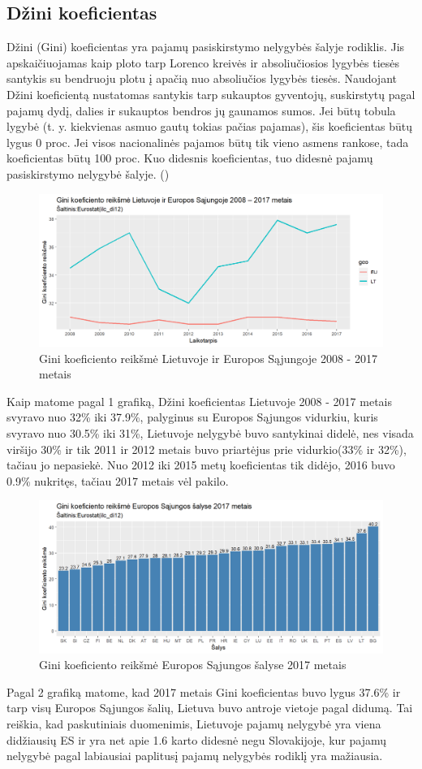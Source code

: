 \documentclass[12pt,a4paper,titlepage]{article}
\begin{document}
\subsection{Džini koeficientas}
Džini (Gini) koeficientas yra pajamų pasiskirstymo nelygybės šalyje
rodiklis. Jis apskaičiuojamas kaip ploto tarp Lorenco kreivės ir absoliučiosios lygybės tiesės santykis su bendruoju plotu į apačią nuo absoliučios lygybės tiesės. Naudojant Džini koeficientą nustatomas santykis tarp sukauptos gyventojų, suskirstytų pagal pajamų dydį, dalies ir sukauptos bendros jų gaunamos sumos. Jei būtų tobula lygybė (t. y. kiekvienas asmuo gautų tokias pačias pajamas), šis koeficientas būtų lygus 0 proc. Jei visos nacionalinės pajamos būtų tik vieno asmens rankose, tada koeficientas būtų 100 proc. Kuo didesnis koeficientas, tuo didesnė pajamų pasiskirstymo nelygybė šalyje. (\cite{lisauskaite2010lietuvos})
\begin{figure}[H]
\includegraphics[scale=0.7]{LTginiFrom2008.png}
\caption{Gini koeficiento reikšmė Lietuvoje ir Europos Sąjungoje 2008 - 2017 metais}
\end{figure}
Kaip matome pagal 1 grafiką, Džini koeficientas Lietuvoje 2008 - 2017 metais svyravo nuo 32\% iki 37.9\%, palyginus su Europos Sąjungos vidurkiu, kuris svyravo nuo 30.5\% iki 31\%, Lietuvoje nelygybė buvo santykinai didelė, nes visada viršijo 30\% ir tik 2011 ir 2012 metais buvo priartėjus prie vidurkio(33\% ir 32\%), tačiau jo nepasiekė. Nuo 2012 iki 2015 metų koeficientas tik didėjo, 2016 buvo 0.9\% nukritęs, tačiau 2017 metais vėl pakilo.
\begin{figure}[H]
\includegraphics[scale=0.7]{AllGini2017.png}
\caption{Gini koeficiento reikšmė Europos Sąjungos šalyse 2017 metais}
\end{figure}
Pagal 2 grafiką matome, kad 2017 metais Gini koeficientas buvo lygus 37.6\% ir tarp visų Europos Sąjungos šalių, Lietuva buvo antroje vietoje pagal didumą. Tai reiškia, kad paskutiniais duomenimis, Lietuvoje pajamų nelygybė yra viena didžiausių ES ir yra net apie 1.6 karto didesnė negu Slovakijoje, kur pajamų nelygybė pagal labiausiai paplitusį pajamų nelygybės rodiklį yra mažiausia.
\end{document}
